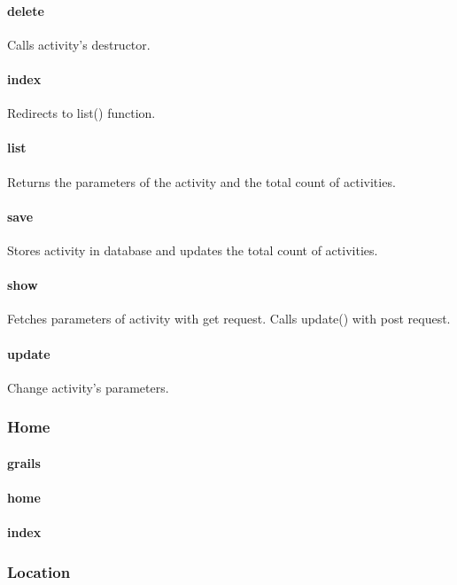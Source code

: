 \documentclass[12pt]{article}
\begin{document}
\paragraph{delete} Calls activity's destructor.
\paragraph{index} Redirects to list() function.
\paragraph{list} Returns the parameters of the activity and the total count of activities.
\paragraph{save} Stores activity in database and updates the total count of activities.
\paragraph{show} Fetches parameters of activity with get request. Calls update() with post request.
\paragraph{update} Change activity's parameters.

\subsubsection{Home}\label{sec:CHome}
\paragraph{grails}
\paragraph{home}
\paragraph{index}

\subsubsection{Location}\label{sec:CLocation}
\end{document}

